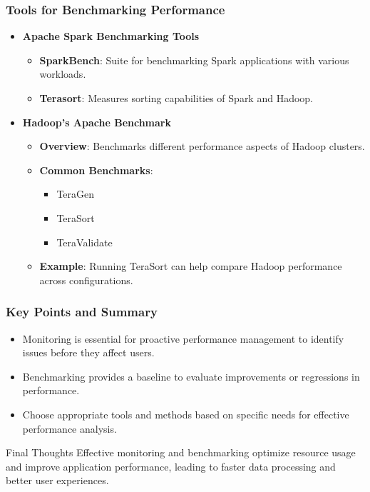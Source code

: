 \documentclass{beamer}
\begin{document}
\begin{frame}[fragile]
    \frametitle{Tools for Benchmarking Performance}
    \begin{itemize}
        \item \textbf{Apache Spark Benchmarking Tools}
            \begin{itemize}
                \item \textbf{SparkBench}: Suite for benchmarking Spark applications with various workloads.
                \item \textbf{Terasort}: Measures sorting capabilities of Spark and Hadoop.
            \end{itemize}
            
        \item \textbf{Hadoop's Apache Benchmark}
            \begin{itemize}
                \item \textbf{Overview}: Benchmarks different performance aspects of Hadoop clusters.
                \item \textbf{Common Benchmarks}:
                    \begin{itemize}
                        \item TeraGen
                        \item TeraSort
                        \item TeraValidate
                    \end{itemize}
                \item \textbf{Example}: Running TeraSort can help compare Hadoop performance across configurations.
            \end{itemize}
    \end{itemize}
\end{frame}

\begin{frame}[fragile]
    \frametitle{Key Points and Summary}
    \begin{itemize}
        \item Monitoring is essential for proactive performance management to identify issues before they affect users.
        \item Benchmarking provides a baseline to evaluate improvements or regressions in performance.
        \item Choose appropriate tools and methods based on specific needs for effective performance analysis.
    \end{itemize}

    \begin{block}{Final Thoughts}
        Effective monitoring and benchmarking optimize resource usage and improve application performance, leading to faster data processing and better user experiences.
    \end{block}
\end{frame}
\end{document}
